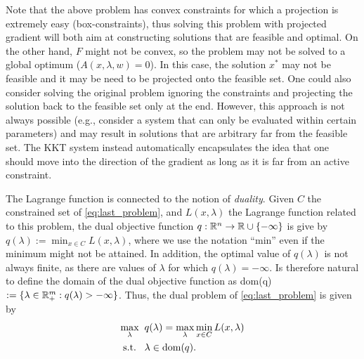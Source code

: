 \documentclass[10pt,a4paper]{article}
\begin{document}
Note that the above problem has convex constraints for which a projection is extremely easy (box-constraints), thus solving this problem with projected gradient will both aim at constructing solutions that are feasible and optimal. On the other hand, $F$ might not be convex, so the problem may not be solved to a global optimum ($A(x,\lambda,w)=0$). In this case, the solution $x^*$ may not be feasible and it may be need to be projected onto the feasible set. One could also consider solving the original problem ignoring the constraints and projecting the solution back to the feasible set only at the end. However, this approach is not always possible (e.g., consider a system that can only be evaluated within certain parameters) and may result in solutions that are arbitrary far from the feasible set. The KKT system instead automatically encapsulates the idea that one should move into the direction of the gradient as long as it is far from an active constraint.

\begin{remark}
	The Lagrange function is connected to the notion of \textit{duality}. Given $C$ the constrained set of \eqref{eq:last_problem}, and $L(x,\lambda)$ the Lagrange function related to this problem, the dual objective function $q:\mathbb{R}^n\to \mathbb{R} \cup \{-\infty\}$ is give by $q(\lambda) := \min_{x\in C} L(x,\lambda)$, where we use the notation ``min'' even if the minimum might not be attained. In addition, the optimal value of $q(\lambda)$ is not always finite, as there are values of $\lambda$ for which $q(\lambda) = -\infty$. Is therefore natural to define the domain of the dual objective function as dom(q)$:=\{\lambda \in \mathbb{R}^m_+: q(\lambda)>-\infty\}$. Thus, the dual problem of \eqref{eq:last_problem} is given by 
	\begin{equation*}
		\begin{split}
			\max_\lambda \;\; &q(\lambda) = \max_\lambda \min_{x\in C} L(x,\lambda)\\
			\text{s.t.} \;\;\;& \lambda\in \text{dom}(q).
		\end{split}
	\end{equation*}
\end{remark}
 
%
%
\end{document}
